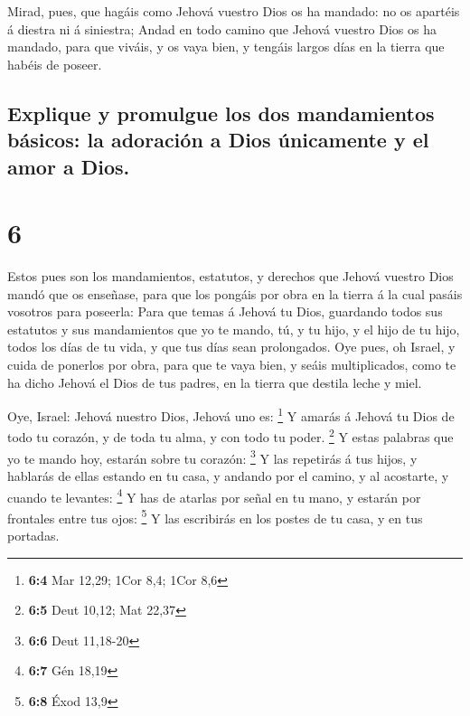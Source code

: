 Mirad, pues, que hagáis como Jehová vuestro Dios os ha
mandado: no os apartéis á diestra ni á siniestra;  Andad
en todo camino que Jehová vuestro Dios os ha mandado, para que viváis, y
os vaya bien, y tengáis largos días en la tierra que habéis de poseer.

\hypertarget{explique-y-promulgue-los-dos-mandamientos-buxe1sicos-la-adoraciuxf3n-a-dios-uxfanicamente-y-el-amor-a-dios.}{%
\subsection{Explique y promulgue los dos mandamientos básicos: la
adoración a Dios únicamente y el amor a
Dios.}\label{explique-y-promulgue-los-dos-mandamientos-buxe1sicos-la-adoraciuxf3n-a-dios-uxfanicamente-y-el-amor-a-dios.}}

\hypertarget{section-5}{%
\section{6}\label{section-5}}

 Estos pues son los mandamientos, estatutos, y derechos
que Jehová vuestro Dios mandó que os enseñase, para que los pongáis por
obra en la tierra á la cual pasáis vosotros para poseerla:
 Para que temas á Jehová tu Dios, guardando todos sus
estatutos y sus mandamientos que yo te mando, tú, y tu hijo, y el hijo
de tu hijo, todos los días de tu vida, y que tus días sean prolongados.
 Oye pues, oh Israel, y cuida de ponerlos por obra, para
que te vaya bien, y seáis multiplicados, como te ha dicho Jehová el Dios
de tus padres, en la tierra que destila leche y miel.

 Oye, Israel: Jehová nuestro Dios, Jehová uno es:
\footnote{\textbf{6:4} Mar 12,29; 1Cor 8,4; 1Cor 8,6}  Y
amarás á Jehová tu Dios de todo tu corazón, y de toda tu alma, y con
todo tu poder. \footnote{\textbf{6:5} Deut 10,12; Mat 22,37}
 Y estas palabras que yo te mando hoy, estarán sobre tu
corazón: \footnote{\textbf{6:6} Deut 11,18-20}  Y las
repetirás á tus hijos, y hablarás de ellas estando en tu casa, y andando
por el camino, y al acostarte, y cuando te levantes: \footnote{\textbf{6:7}
  Gén 18,19}  Y has de atarlas por señal en tu mano, y
estarán por frontales entre tus ojos: \footnote{\textbf{6:8} Éxod 13,9}
 Y las escribirás en los postes de tu casa, y en tus
portadas.

